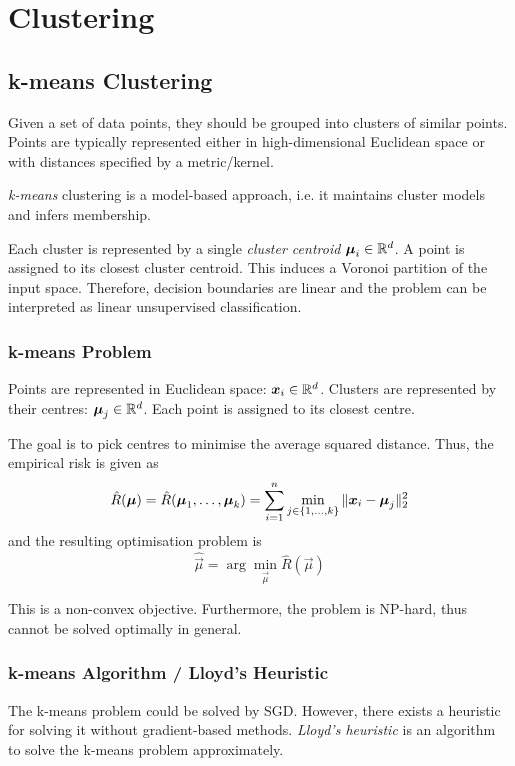\chapter{Clustering}

\section{k-means Clustering}
Given a set of data points,
they should be grouped into clusters of similar points.
Points are typically represented either in high-dimensional
Euclidean space or with distances specified by a metric/kernel.

\emph{k-means} clustering is a model-based approach,
i.e. it maintains cluster models and infers membership.

Each cluster is represented by a single
\emph{cluster centroid} $\boldsymbol{\mu}_i \in \mathbb{R}^d$.
A point is assigned to its closest cluster centroid.
This induces a Voronoi partition of the input space.
Therefore, decision boundaries are linear and the problem
can be interpreted as linear unsupervised classification.

\subsection{k-means Problem}
Points are represented in Euclidean space:
$\boldsymbol{x}_i \in \mathbb{R}^d$.
Clusters are represented by their centres:
$\boldsymbol{\mu}_j \in \mathbb{R}^d$.
Each point is assigned to its closest centre.

The goal is to pick centres to minimise the average squared
distance. Thus, the empirical risk is given as
\begin{equation*}
\hat{R}(\boldsymbol{\mu}) =
\hat{R}(\boldsymbol{\mu}_1, \dotsc, \boldsymbol{\mu}_k) =
\sum_{i=1}^n{
	\min_{
		j \in \{1, \dotsc, k\}
	}{\lVert\boldsymbol{x}_i - \boldsymbol{\mu}_j\rVert_2^2}
}
\end{equation*}
and the resulting optimisation problem is
\begin{equation*}
\hat{\vec{\mu}} = \arg\min_{\vec{\mu}}{\hat{R}(\vec{\mu})}
\end{equation*}

This is a non-convex objective.
Furthermore, the problem is NP-hard,
thus cannot be solved optimally in general.


\subsection{k-means Algorithm / Lloyd's Heuristic}
The k-means problem could be solved by SGD.
However, there exists a heuristic for solving it
without gradient-based methods.
\emph{Lloyd's heuristic} is an algorithm to solve the
k-means problem approximately.

